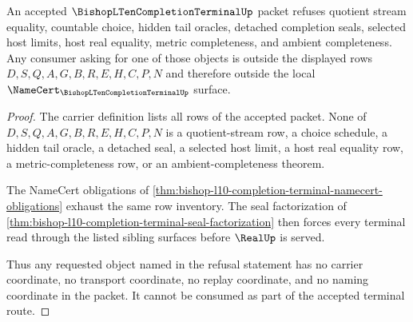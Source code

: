 \begin{theorem}
\label{thm:bishop-l10-completion-terminal-refusal-ledger}
An accepted $\BishopLTenCompletionTerminalUp$ packet refuses quotient stream equality, countable choice, hidden tail oracles, detached completion seals, selected host limits, host real equality, metric completeness, and ambient completeness. Any consumer asking for one of those objects is outside the displayed rows $D,S,Q,A,G,B,R,E,H,C,P,N$ and therefore outside the local $\NameCert_{\BishopLTenCompletionTerminalUp}$ surface.
\end{theorem}
\begin{proof}
The carrier definition lists all rows of the accepted packet. None of $D,S,Q,A,G,B,R,E,H,C,P,N$ is a quotient-stream row, a choice schedule, a hidden tail oracle, a detached seal, a selected host limit, a host real equality row, a metric-completeness row, or an ambient-completeness theorem.

The NameCert obligations of \autoref{thm:bishop-l10-completion-terminal-namecert-obligations} exhaust the same row inventory. The seal factorization of \autoref{thm:bishop-l10-completion-terminal-seal-factorization} then forces every terminal read through the listed sibling surfaces before $\RealUp$ is served.

Thus any requested object named in the refusal statement has no carrier coordinate, no transport coordinate, no replay coordinate, and no naming coordinate in the packet. It cannot be consumed as part of the accepted terminal route.
\end{proof}




